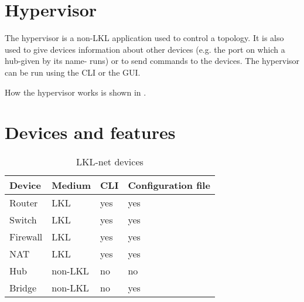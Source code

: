 \section{Hypervisor}
\label{sub-sec:hypervisor}
The hypervisor is a non-LKL application used to control a topology. It is also used to give devices information 
about other devices (e.g. the port on which a hub-given by its name- runs) or to send commands to the devices. 
The hypervisor can be run using the CLI or the GUI.

How the hypervisor works is shown in . 

\section{Devices and features}
\begin{center}
  \begin{table}[htb]
  \begin{center}
  \begin{tabular}{ | l | l | l | l |}
    \hline
      \textbf{Device} & \textbf{Medium} & \textbf{CLI} & \textbf{Configuration file}}\\ \hline
      Router & LKL & yes & yes\\ \hline
      Switch & LKL & yes & yes\\ \hline
      Firewall & LKL & yes & yes\\ \hline
      NAT & LKL & yes & yes\\ \hline
      Hub & non-LKL & no & no\\ \hline
      Bridge & non-LKL & no & yes\\ 
    \hline
  \end{tabular}
  \end{center}
  \caption{LKL-net devices}
  \label{table:tdevices}
  \end{table}
\end{center}
